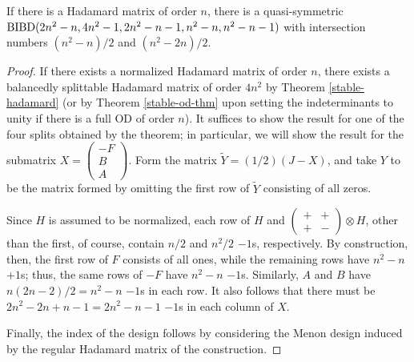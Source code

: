 \documentclass[../../../main]{subfiles}
\begin{document}
\begin{prop}
 If there is a Hadamard matrix of order $n$, there is a quasi-symmetric $\text{BIBD}(2n^2-n,4n^2-1,2n^2-n-1,n^2-n,n^2-n-1)$ with intersection numbers $(n^2-n)/2$ and $(n^2-2n)/2$.
\end{prop}

\begin{proof}
 If there exists a normalized Hadamard matrix of order $n$, there exists a balancedly splittable Hadamard matrix of order $4n^2$ by Theorem \ref{stable-hadamard} (or by Theorem \ref{stable-od-thm} upon setting the indeterminants to unity if there is a full OD of order $n$). It suffices to show the result for one of the four splits obtained by the theorem; in particular, we will show the result for the submatrix $X=\left(\begin{smallmatrix} -F \\ B \\ A \end{smallmatrix}\right)$. Form the matrix $\tilde Y = (1/2)(J-X)$, and take $Y$ to be the matrix formed by omitting the first row of $\tilde Y$ consisting of all zeros.
 
 Since $H$ is assumed to be normalized, each row of $H$ and $\left(\begin{smallmatrix}+&+\\+&-\end{smallmatrix}\right) \otimes H$, other than the first, of course, contain $n/2$ and $n^2/2$ $-1$s, respectively. By construction, then, the first row of $F$ consists of all ones, while the remaining rows have $n^2-n$ $+1$s; thus, the same rows of $-F$ have $n^2-n$ $-1$s. Similarly, $A$ and $B$ have $n(2n-2)/2 = n^2-n$ $-1$s in each row. It also follows that there must be $2n^2-2n+n-1=2n^2-n-1$ $-1$s in each column of $X$.
 
 Finally, the index of the design follows by considering the Menon design  induced by the regular Hadamard matrix of the construction.
 

\end{proof}
\end{document}
